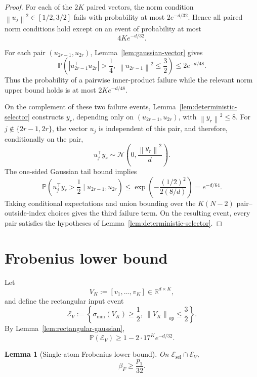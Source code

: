 \documentclass[11pt]{article}
\newtheorem{lemma}[theorem]{Lemma}
\newcommand{\R}{\mathbb{R}}
\newcommand{\Pp}{\mathbb{P}}
\newcommand{\1}{\mathbf{1}}
\newcommand{\op}{\mathrm{op}}
\newcommand{\norm}[1]{\left\|#1\right\|}
\newcommand{\abs}[1]{\left|#1\right|}
\begin{document}
\begin{proof}
For each of the \(2K\) paired vectors, the norm condition
\(\norm{u_j}^2\in[1/2,3/2]\) fails with probability at most
\(2e^{-d/32}\).  Hence all paired norm conditions hold except on an event of
probability at most
\[
 4K e^{-d/32}.
\]

For each pair \((u_{2r-1},u_{2r})\), Lemma~\ref{lem:gaussian-vector} gives
\[
 \Pp\left(
 \abs{u_{2r-1}^\top u_{2r}}>\frac14,
 \ \norm{u_{2r-1}}^2\le\frac32
 \right)
 \le2e^{-d/48}.
\]
Thus the probability of a pairwise inner-product failure while the relevant
norm upper bound holds is at most \(2K e^{-d/48}\).

On the complement of these two failure events,
Lemma~\ref{lem:deterministic-selector} constructs \(y_r\), depending only on
\((u_{2r-1},u_{2r})\), with \(\norm{y_r}^2\le8\).  For
\(j\notin\{2r-1,2r\}\), the vector \(u_j\) is independent of this pair, and
therefore, conditionally on the pair,
\[
 u_j^\top y_r
 \sim
 \mathcal N\left(0,\frac{\norm{y_r}^2}{d}\right).
\]
The one-sided Gaussian tail bound implies
\[
 \Pp\left(u_j^\top y_r>\frac12\mid u_{2r-1},u_{2r}\right)
 \le
 \exp\left(-\frac{(1/2)^2}{2(8/d)}\right)
 =e^{-d/64}.
\]
Taking conditional expectations and union bounding over the \(K(N-2)\)
pair--outside-index choices gives the third failure term.  On the resulting
event, every pair satisfies the hypotheses of
Lemma~\ref{lem:deterministic-selector}.
\end{proof}

\section{Frobenius lower bound}
\label{sec:frobenius-lower}

Let
\[
 V_K:=[v_1,\ldots,v_K]\in\R^{d\times K},
\]
and define the rectangular input event
\[
 \mathcal E_V
 :=
 \left\{
 \sigma_{\min}(V_K)\ge\frac12,
 \ \norm{V_K}_{\op}\le\frac32
 \right\}.
\]
By Lemma~\ref{lem:rectangular-gaussian},
\begin{equation}
 \Pp(\mathcal E_V)
 \ge1-2\cdot17^K e^{-d/32}.
 \label{eq:EV-probability}
\end{equation}

\begin{lemma}[Single-atom Frobenius lower bound]
\label{lem:single-atom-lower}
On \(\mathcal E_{\mathrm{sel}}\cap\mathcal E_V\),
\[
 \beta_F\ge\frac{p_1}{32}.
\]
\end{lemma}
\end{document}
